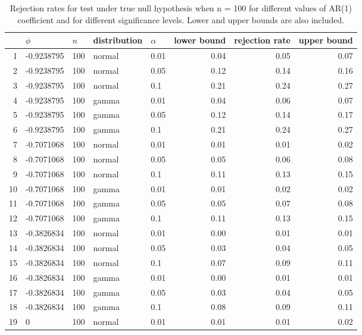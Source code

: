 \begin{table}[ht]
\centering
\caption{Rejection rates for test under true null hypothesis
                   when n = 100 for 
                   different values of AR(1) coefficient and for different 
                   significance levels. Lower and upper bounds are also 
                   included.} 
\label{table:rr_100}
\begin{tabular}{rllllrrr}
  \hline
 & $\phi$ & $n$ & distribution & $\alpha$ & lower bound & rejection rate & upper bound \\ 
  \hline
1 & -0.9238795 & 100 & normal & 0.01 & 0.04 & 0.05 & 0.07 \\ 
  2 & -0.9238795 & 100 & normal & 0.05 & 0.12 & 0.14 & 0.16 \\ 
  3 & -0.9238795 & 100 & normal & 0.1 & 0.21 & 0.24 & 0.27 \\ 
  4 & -0.9238795 & 100 & gamma & 0.01 & 0.04 & 0.06 & 0.07 \\ 
  5 & -0.9238795 & 100 & gamma & 0.05 & 0.12 & 0.14 & 0.17 \\ 
  6 & -0.9238795 & 100 & gamma & 0.1 & 0.21 & 0.24 & 0.27 \\ 
  7 & -0.7071068 & 100 & normal & 0.01 & 0.01 & 0.01 & 0.02 \\ 
  8 & -0.7071068 & 100 & normal & 0.05 & 0.05 & 0.06 & 0.08 \\ 
  9 & -0.7071068 & 100 & normal & 0.1 & 0.11 & 0.13 & 0.15 \\ 
  10 & -0.7071068 & 100 & gamma & 0.01 & 0.01 & 0.02 & 0.02 \\ 
  11 & -0.7071068 & 100 & gamma & 0.05 & 0.05 & 0.07 & 0.08 \\ 
  12 & -0.7071068 & 100 & gamma & 0.1 & 0.11 & 0.13 & 0.15 \\ 
  13 & -0.3826834 & 100 & normal & 0.01 & 0.00 & 0.01 & 0.01 \\ 
  14 & -0.3826834 & 100 & normal & 0.05 & 0.03 & 0.04 & 0.05 \\ 
  15 & -0.3826834 & 100 & normal & 0.1 & 0.07 & 0.09 & 0.11 \\ 
  16 & -0.3826834 & 100 & gamma & 0.01 & 0.00 & 0.01 & 0.01 \\ 
  17 & -0.3826834 & 100 & gamma & 0.05 & 0.03 & 0.04 & 0.05 \\ 
  18 & -0.3826834 & 100 & gamma & 0.1 & 0.08 & 0.09 & 0.11 \\ 
  19 & 0 & 100 & normal & 0.01 & 0.01 & 0.01 & 0.02 \\ 

\end{tabular}
\end{table}
